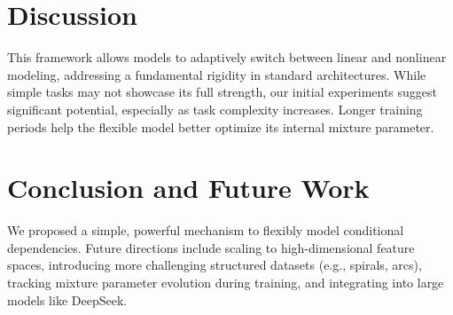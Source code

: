 \documentclass[11pt]{article}
\begin{document}
\section{Discussion}
This framework allows models to adaptively switch between linear and nonlinear modeling, addressing a fundamental rigidity in standard architectures. While simple tasks may not showcase its full strength, our initial experiments suggest significant potential, especially as task complexity increases. Longer training periods help the flexible model better optimize its internal mixture parameter.

\section{Conclusion and Future Work}
We proposed a simple, powerful mechanism to flexibly model conditional dependencies. Future directions include scaling to high-dimensional feature spaces, introducing more challenging structured datasets (e.g., spirals, arcs), tracking mixture parameter evolution during training, and integrating into large models like DeepSeek.



\end{document}
